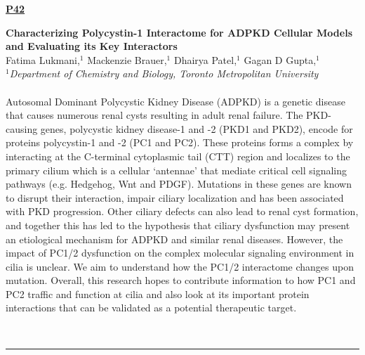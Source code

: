 \documentclass[titlepage,oneside,openany,10pt]{book}
\newenvironment{posterabs}[4] %
        {
	\begin{flushright}
                \underline{\textbf{#4}}
        \end{flushright}
        \textbf{#1}\\%
        #2\\%
        \textit{#3}\\\\%
        }
        {
        \\
        \noindent\rule{15cm}{0.5pt}%
        }
\begin{document}
\begin{posterabs}
    {Characterizing Polycystin-1 Interactome for ADPKD Cellular Models and Evaluating its Key Interactors}
    {Fatima Lukmani,$^{1}$ Mackenzie Brauer,$^{1}$ Dhairya Patel,$^{1}$ Gagan D Gupta,$^{1}$}
    {
    $^1$Department of Chemistry and Biology, Toronto Metropolitan University
    }
    {P42}
    Autosomal Dominant Polycystic Kidney Disease (ADPKD) is a genetic disease that causes numerous renal cysts resulting in adult renal failure. The PKD-causing genes, polycystic kidney disease-1 and -2 (PKD1 and PKD2), encode for proteins polycystin-1 and -2 (PC1 and PC2). These proteins forms a complex by interacting at the C-terminal cytoplasmic tail (CTT) region and localizes to the primary cilium which is a cellular `antennae' that mediate critical cell signaling pathways (e.g. Hedgehog, Wnt and PDGF). Mutations in these genes are known to disrupt their interaction, impair ciliary localization and has been associated with PKD progression. Other ciliary defects can also lead to renal cyst formation, and together this has led to the hypothesis that ciliary dysfunction may present an etiological mechanism for ADPKD and similar renal diseases. However, the impact of PC1/2 dysfunction on the complex molecular signaling environment in cilia is unclear. We aim to understand how the PC1/2 interactome changes upon mutation. Overall, this research hopes to contribute information to how PC1 and PC2 traffic and function at cilia and also look at its important protein interactions that can be validated as a potential therapeutic target.
    \label{LukmaniF}
\end{posterabs}

\newpage
\end{document}
